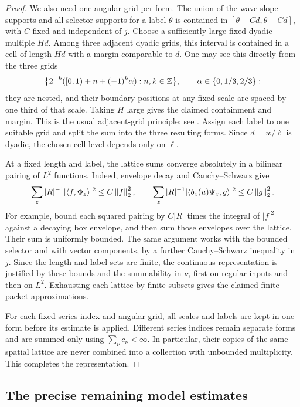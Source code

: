 \begin{proof}
We also need one angular grid per form. The union of the wave slope
supports and all selector supports for a label \(\theta\) is
contained in \([\theta-Cd,\theta+Cd]\), with \(C\) fixed and
independent of \(j\). Choose a sufficiently large fixed dyadic
multiple \(H d\). Among three adjacent dyadic grids, this interval
is contained in a cell of length \(H d\) with a margin comparable
to \(d\). One may see this directly from the three grids
\[
 \bigl\{2^{-k}([0,1)+n+(-1)^k\alpha):n,k\in\mathbb Z\bigr\},
       \qquad \alpha\in\{0,1/3,2/3\}:
\]
they are nested, and their boundary positions at any fixed scale
are spaced by one third of that scale. Taking \(H\) large gives
the claimed containment and margin. This is the usual adjacent-grid
principle; see \cite[Theorem~3.1 and Remark~3.2]{LernerNazarov2019}.
Assign each label to one suitable grid and split the sum into the
three resulting forms. Since \(d=w/\ell\) is dyadic, the chosen
cell level depends only on \(\ell\).

At a fixed length and label, the lattice sums converge absolutely
in a bilinear pairing of \(L^2\) functions. Indeed, envelope
decay and Cauchy--Schwarz give
\[
 \sum_z |R|^{-1}|\langle f,\Phi_z\rangle|^2
       \le C\left\|f\right\|_2^2,
 \qquad
 \sum_z |R|^{-1}|\langle b_z(u)\Psi_z,g\rangle|^2
       \le C\left\|g\right\|_2^2.
\]
For example, bound each squared pairing by \(C|R|\) times the
integral of \(|f|^2\) against a decaying box envelope, and then
sum those envelopes over the lattice. Their sum is uniformly
bounded. The same argument works with the bounded selector and
with vector components, by a further Cauchy--Schwarz inequality in
\(j\). Since the length and label sets are finite, the continuous
representation is justified by these bounds and the summability in
\(\nu\), first on regular inputs and then on \(L^2\).
Exhausting each lattice by finite subsets gives the claimed finite
packet approximations.

For each fixed series index and angular grid, all scales and labels
are kept in one form before its estimate is applied. Different series
indices remain separate forms and are summed only using
\(\sum_\nu c_\nu<\infty\). In particular, their copies of the
same spatial lattice are never combined into a collection with
unbounded multiplicity. This completes the representation.
\end{proof}

\subsection{The precise remaining model estimates}

